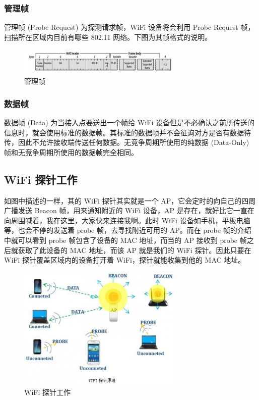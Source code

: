 \subsubsection{管理帧}

管理帧 (Probe Request) 为探测请求帧，WiFi 设备将会利用 Probe Request 帧，扫描所在区域内目前有哪些 802.11 网络。下图为其帧格式的说明。

\begin{figure}[htb]
\centering 
\includegraphics[width=0.70\textwidth]{img/ch1s5m4.jpg} 
\caption{管理帧}
\label{Test}
\end{figure}

\subsubsection{数据帧}

数据帧 (Data) 为当接入点要送出一个帧给 WiFi 设备但是不必确认之前所传送的信息时，就会使用标准的数据帧。其标准的数据帧并不会征询对方是否有数据待传，因此不允许接收端传送任何数据。无竞争周期所使用的纯数据 (Data-Only) 帧和无竞争周期所使用的数据帧完全相同。

\subsection{WiFi 探针工作}

如图中描述的一样，其的 WiFi 探针其实就是一个 AP，它会定时的向自己的四周广播发送 Beacon 帧，用来通知附近的 WiFi 设备，AP 是存在，就好比它一直在向周围喊着，我在这里，大家快来连接我啊。此时 WiFi 设备如手机，平板电脑等，也会不停的发送着 probe 帧，去寻找附近可用的 AP。而在 probe 帧的介绍中就可以看到 probe 帧包含了设备的 MAC 地址，而当的 AP 接收到 probe 帧之后就获取了此设备的 MAC 地址，而该 AP 就是我们的 WiFi 探针。因此只要在 WiFi 探针覆盖区域内的设备打开着 WiFi，探针就能收集到他的 MAC 地址。

\begin{figure}[htb]
\centering 
\includegraphics[width=0.70\textwidth]{img/ch1s5m5.jpg} 
\caption{WiFi 探针工作}
\label{Test}
\end{figure}

